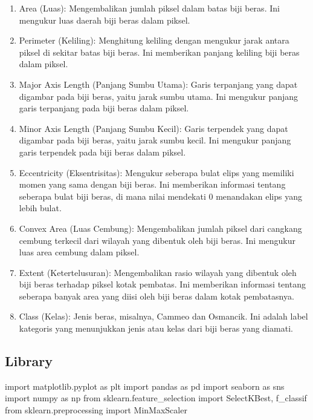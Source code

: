 \documentclass[
  letterpaper,
]{krantz}
\makeatletter
\newenvironment{Shaded}{\begin{snugshade}}{\end{snugshade}}
\newcommand{\ImportTok}[1]{\textcolor[rgb]{0.00,0.46,0.62}{#1}}
\newcommand{\NormalTok}[1]{\textcolor[rgb]{0.00,0.23,0.31}{#1}}
\newenvironment{kframe}{%
\medskip{}
\setlength{\fboxsep}{.8em}
 \def\at@end@of@kframe{}%
 \ifinner\ifhmode%
  \def\at@end@of@kframe{\end{minipage}}%
  \begin{minipage}{\columnwidth}%
 \fi\fi%
 \def\FrameCommand##1{\hskip\@totalleftmargin \hskip-\fboxsep
 \colorbox{shadecolor}{##1}\hskip-\fboxsep
     \hskip-\linewidth \hskip-\@totalleftmargin \hskip\columnwidth}%
 \MakeFramed {\advance\hsize-\width
   \@totalleftmargin\z@ \linewidth\hsize
   \@setminipage}}%
 {\par\unskip\endMakeFramed%
 \at@end@of@kframe}
\renewenvironment{Shaded}{\begin{kframe}}{\end{kframe}}
\makeatother
\begin{document}
\begin{enumerate}
\def\labelenumi{\arabic{enumi}.}
\item
  Area (Luas): Mengembalikan jumlah piksel dalam batas biji beras. Ini
  mengukur luas daerah biji beras dalam piksel.
\item
  Perimeter (Keliling): Menghitung keliling dengan mengukur jarak antara
  piksel di sekitar batas biji beras. Ini memberikan panjang keliling
  biji beras dalam piksel.
\item
  Major Axis Length (Panjang Sumbu Utama): Garis terpanjang yang dapat
  digambar pada biji beras, yaitu jarak sumbu utama. Ini mengukur
  panjang garis terpanjang pada biji beras dalam piksel.
\item
  Minor Axis Length (Panjang Sumbu Kecil): Garis terpendek yang dapat
  digambar pada biji beras, yaitu jarak sumbu kecil. Ini mengukur
  panjang garis terpendek pada biji beras dalam piksel.
\item
  Eccentricity (Eksentrisitas): Mengukur seberapa bulat elips yang
  memiliki momen yang sama dengan biji beras. Ini memberikan informasi
  tentang seberapa bulat biji beras, di mana nilai mendekati 0
  menandakan elips yang lebih bulat.
\item
  Convex Area (Luas Cembung): Mengembalikan jumlah piksel dari cangkang
  cembung terkecil dari wilayah yang dibentuk oleh biji beras. Ini
  mengukur luas area cembung dalam piksel.
\item
  Extent (Ketertelusuran): Mengembalikan rasio wilayah yang dibentuk
  oleh biji beras terhadap piksel kotak pembatas. Ini memberikan
  informasi tentang seberapa banyak area yang diisi oleh biji beras
  dalam kotak pembatasnya.
\item
  Class (Kelas): Jenis beras, misalnya, Cammeo dan Osmancik. Ini adalah
  label kategoris yang menunjukkan jenis atau kelas dari biji beras yang
  diamati.
\end{enumerate}

\hypertarget{library}{%
\subsection{Library}\label{library}}

\begin{Shaded}
\begin{Highlighting}[]
\ImportTok{import}\NormalTok{ matplotlib.pyplot }\ImportTok{as}\NormalTok{ plt}
\ImportTok{import}\NormalTok{ pandas }\ImportTok{as}\NormalTok{ pd}
\ImportTok{import}\NormalTok{ seaborn }\ImportTok{as}\NormalTok{ sns}
\ImportTok{import}\NormalTok{ numpy }\ImportTok{as}\NormalTok{ np}
\ImportTok{from}\NormalTok{ sklearn.feature\_selection }\ImportTok{import}\NormalTok{ SelectKBest, f\_classif}
\ImportTok{from}\NormalTok{ sklearn.preprocessing }\ImportTok{import}\NormalTok{ MinMaxScaler}

\end{Highlighting}
\end{Shaded}
\end{document}
